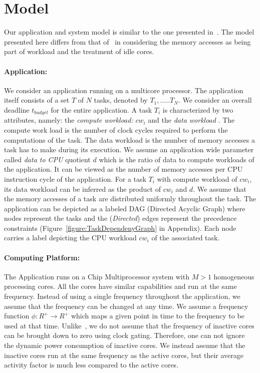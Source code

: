 \documentclass[11pt, letterpaper]{article}
\begin{document}
\section{Model}\label{Model}
Our application and system model is similar to the one presented in~\cite{ConvexAndScheduling}. 
The model presented here differs from that of~\cite{ConvexAndScheduling} in considering the memory accesses as being part of workload and the treatment of idle cores.
\paragraph{Application:}
We consider an application running on a multicore processor. The application itself consists of a set $T$ of $N$ tasks, denoted by ${T_1,.....T_N}$. We consider an overall deadline $t_{budget}$ for the entire application. A task $T_i$ is characterized by two attributes, namely: the \emph{compute workload:} $cw_i$ and the \emph{data workload} . The compute work load is the number of clock cycles required to perform the computations of the task. The data workload is the number of memory accesses a task has to make during its execution. We assume an application wide parameter called \emph{data to CPU} quotient $d$ which is the ratio of data to compute workloads of the application. It can be viewed as the number of memory accesses per CPU instruction cycle of the application. For a task $T_i$ with compute workload of $cw_i$, its data workload can be inferred as the product of $cw_i$ and $d$. We assume that the memory accesses of a task are distributed uniformly throughout the task.
The application can be depicted as a labeled DAG (Directed Acyclic Graph) where nodes represent the tasks and the (\emph{Directed}) edges represent the precedence constraints (Figure~\ref{figure:TaskDependenyGraph} in Appendix). Each node carries a label depicting the CPU workload $cw_i$ of the associated task. 


\paragraph{Computing Platform:} The Application runs on a Chip Multiprocessor system with $M > 1$ homogeneous processing cores. All the cores have similar capabilities and run at the same frequency. Instead of using a single frequency throughout the application, we assume that the frequency can be changed at any time. We assume a frequency function $\phi:R^+ \to R^+$ which maps a given point in time to the frequency to be used at that time. Unlike~\cite{ConvexAndScheduling}, we do not assume that the frequency of inactive cores can be brought down to zero using clock gating. Therefore, one can not ignore the dynamic power consumption of inactive cores. We instead assume that the inactive cores run at the same frequency as the active cores, but their average activity factor is much less compared to the active cores. 
\end{document}
